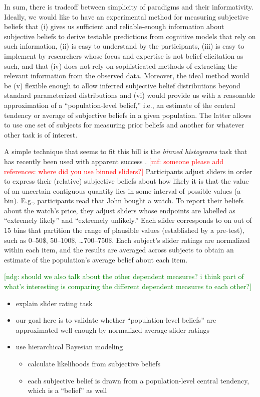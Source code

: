 \documentclass[10pt,letterpaper]{article}
\newcommand{\ndg}[1]{\textcolor{Green}{[ndg: #1]}}
\newcommand{\mf}[1]{\textcolor{Red}{[mf: #1]}}
\newcommand{\citep}[1]{\cite{#1}}
\begin{document}
In sum, there is tradeoff between simplicity of paradigms and their informativity. Ideally, we
would like to have an experimental method for measuring subjective beliefs that (i) gives us
sufficient and reliable-enough information about subjective beliefs to derive testable
predictions from cognitive models that rely on such information, (ii) is easy to understand by
the participants, (iii) is easy to implement by researchers whose focus and expertise is not
belief-elicitation as such, and that (iv) does not rely on sophisticated methods of extracting
the relevant information from the observed data. Moreover, the ideal method would be (v)
flexible enough to allow inferred subjective belief distributions beyond standard parameterized
distributions and (vi) would provide us with a reasonable approximation of a ``population-level
belief,'' i.e., an estimate of the central tendency or average of subjective beliefs in a given
population. The latter allows to use one set of subjects for measuring prior beliefs and
another for whatever other task is of interest.

A simple technique that seems to fit this bill is the \emph{binned histograms} task that has
recently been used with apparent success
\citep{KaoWu2014:Nonliteral-Unde,SchollerFranke2015:Semantic-values}. \mf{someone please add
  references: where did you use binned sliders?} Participants adjust sliders in order to
express their (relative) subjective beliefs about how likely it is that the value of an
uncertain contiguous quantity lies in some interval of possible values (a bin). E.g.,
participants read that John bought a watch.  To report their beliefs about the watch's price,
they adjust sliders whose endpoints are labelled as ``extremely likely'' and ``extremely
unlikely.'' Each slider corresponds to on out of 15 bins that partition the range of plausible
values (established by a pre-test), such as 0--50\$, 50--100\$, \dots 700--750\$. Each
subject's slider ratings are normalized within each item, and the results are averaged across
subjects to obtain an estimate of the population's average belief about each item. 



\ndg{should we also talk about the other dependent measures? i think part of what's interesting is comparing the different dependent measures to each other?}

\begin{itemize}
\item explain slider rating task
\item our goal here is to validate whether ``population-level beliefs'' are approximated well
  enough by normalized average slider ratings
\item use hierarchical Bayesian modeling
  \begin{itemize}
  \item calculate likelihoods from subjective beliefs
  \item each subjective belief is drawn from a population-level central tendency, which is a
    ``belief'' as well
  \end{itemize}
\end{itemize}
\end{document}
